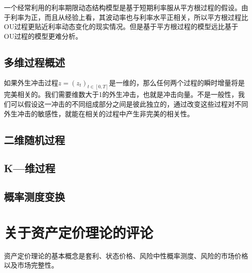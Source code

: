 \documentclass[UTF8]{ctexart}
\begin{document}
一个经常利用的利率期限动态结构模型是基于短期利率服从平方根过程的假设。由于利率为正，而且从经验上看，其波动率也与利率水平正相关，所以平方根过程比OU过程更贴近利率动态变化的现实情况。但是基于平方根过程的模型远比基于OU过程的模型更难分析。

\subsection{多维过程概述}

如果外生冲击过程$z=(z_t)_{t \in [0,T]}$是一维的，那么任何两个过程的瞬时增量将是完美相关的。我们需要维数大于1的外生冲击，也就是冲击向量。不是一般性，我们可以假设这一冲击的不同组成部分之间是彼此独立的，通过改变这些过程对不同外生冲击的敏感性，就能在相关的过程中产生非完美的相关性。

\subsection{二维随机过程}

\subsection{K---维过程}

\subsection{概率测度变换}

\section{关于资产定价理论的评论}

资产定价理论的基本概念是套利、状态价格、风险中性概率测度、风险的市场价格以及市场完整性。
\end{document}
